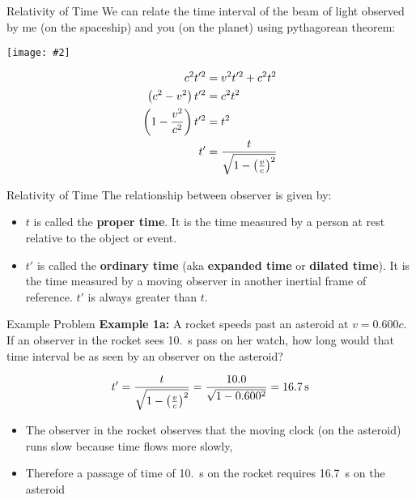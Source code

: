 \documentclass[12pt,compress,aspectratio=169]{beamer}
\newcommand{\pic}[2]{\texttt{[image: \#2]}}
\newcommand{\bigsqrt}{\ensuremath\sqrt{1-\left(\frac{v}{c}\right)^2}}
\newcommand{\eq}[2]{\vspace{#1}{\Large\begin{displaymath}#2\end{displaymath}}}
\begin{document}
\begin{frame}{Relativity of Time}
  We can relate the time interval of the beam of light observed by me (on the
  spaceship) and you (on the planet) using pythagorean theorem:
  \begin{center}
    \pic{.6}{graphics/dilation.png}
  \end{center}
  \begin{align*}
    c^2t'^2 &=v^2t'^2 + c^2t^2\\
    \left(c^2-v^2\right)t'^2 &=c^2t^2\\
    \left(1-\frac{v^2}{c^2}\right)t'^2 &=t^2\\
    t' &=\frac{t}{\bigsqrt}
  \end{align*}
\end{frame}


\begin{frame}{Relativity of Time}
  The relationship between observer is given by:
  
  \eq{-.2in}{
    \boxed{t' =\frac{t}{\bigsqrt}}
  }
  \begin{itemize}
  \item $t$ is called the \textbf{proper time}. It is the time measured
    by a person at rest relative to the object or event.
  \item $t'$ is called the \textbf{ordinary time} (aka \textbf{expanded time}
    or \textbf{dilated time}). It is the time measured by a moving observer in
    another inertial frame of reference. $t'$ is always greater than $t$.
  \end{itemize}
\end{frame}



\begin{frame}{Example Problem}
  \textbf{Example 1a:} A rocket speeds past an asteroid at $v=0.600c$. If an
  observer in the rocket sees \SI{10.}{\second} pass on her watch, how long
  would that time interval be as seen by an observer on the asteroid?

  \begin{displaymath}
    t' =\frac{t}{\bigsqrt}=\frac{10.0}{\sqrt{1-0.600^2}}=\SI{16.7}{\second}
  \end{displaymath}

  \begin{itemize}
  \item The observer in the rocket observes that the moving clock
    (on the asteroid) runs slow because time flows more slowly,
  \item Therefore a passage of time of \SI{10.}{\second} on the rocket
    requires \SI{16.7}{\second} on the asteroid
  \end{itemize}
\end{frame}
\end{document}
